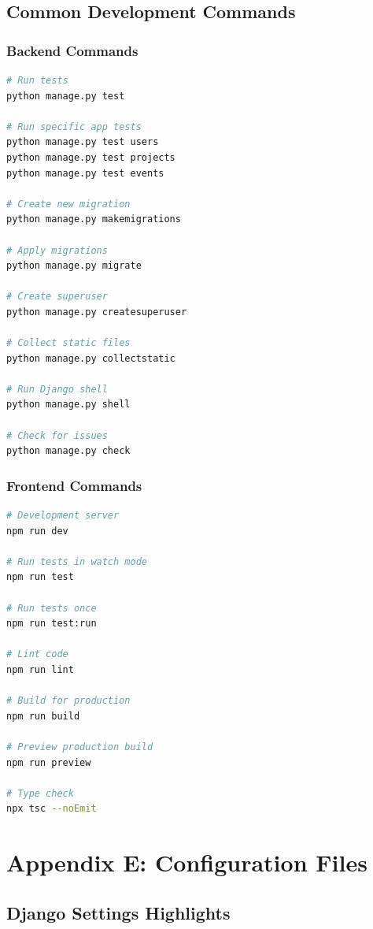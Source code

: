 \documentclass[11pt,a4paper]{article}
\begin{document}
\subsection{Common Development Commands}

\subsubsection{Backend Commands}
\begin{lstlisting}[language=bash]
# Run tests
python manage.py test

# Run specific app tests
python manage.py test users
python manage.py test projects
python manage.py test events

# Create new migration
python manage.py makemigrations

# Apply migrations
python manage.py migrate

# Create superuser
python manage.py createsuperuser

# Collect static files
python manage.py collectstatic

# Run Django shell
python manage.py shell

# Check for issues
python manage.py check
\end{lstlisting}

\subsubsection{Frontend Commands}
\begin{lstlisting}[language=bash]
# Development server
npm run dev

# Run tests in watch mode
npm run test

# Run tests once
npm run test:run

# Lint code
npm run lint

# Build for production
npm run build

# Preview production build
npm run preview

# Type check
npx tsc --noEmit
\end{lstlisting}


\section{Appendix E: Configuration Files}

\subsection{Django Settings Highlights}
\end{document}
